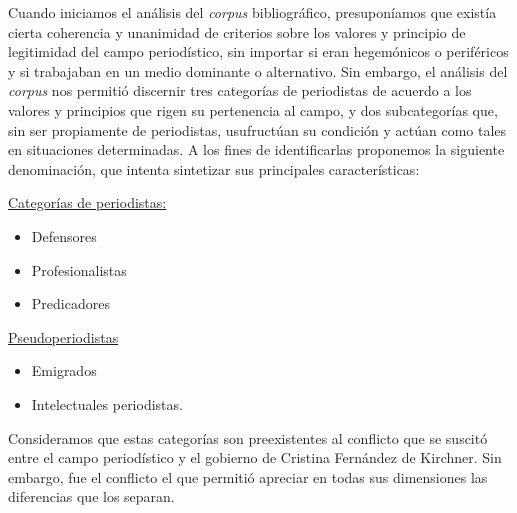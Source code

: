 %
%

Cuando iniciamos el análisis del \emph{corpus} bibliográfico, presuponíamos que existía cierta coherencia y unanimidad de criterios sobre los valores y principio de legitimidad del campo periodístico, sin importar si eran hegemónicos o periféricos y si trabajaban en un medio dominante o alternativo. Sin embargo, el análisis del \emph{corpus} nos permitió discernir tres categorías de periodistas de acuerdo a los valores y principios que rigen su pertenencia al campo, y dos subcategorías que, sin ser propiamente de periodistas, usufructúan su condición y actúan como tales en situaciones determinadas. A los fines de identificarlas proponemos la siguiente denominación, que intenta sintetizar sus principales características:

\ul{Categorías de periodistas:}

\begin{itemize}
\item
  Defensores
\item
  Profesionalistas
\item
  Predicadores
\end{itemize}

\ul{Pseudoperiodistas}

\begin{itemize}
\item
  Emigrados
\item
  Intelectuales periodistas.
\end{itemize}

Consideramos que estas categorías son preexistentes al conflicto que se suscitó entre el campo periodístico y el gobierno de Cristina Fernández de Kirchner. Sin embargo, fue el conflicto el que permitió apreciar en todas sus dimensiones las diferencias que los separan.


